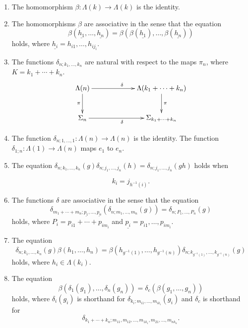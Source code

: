 \begin{thm}
\begin{enumerate}
\item\label{eq2} The homomorphism $\beta \colon \Lambda(k) \rightarrow \Lambda(k)$ is the identity.
\item\label{eq3} The homomorphisms $\beta$ are associative in the sense that the equation
\[
  \beta(\underline{h_1},\ldots,\underline{h_n}) = \beta(\beta(\underline{h_1}),\ldots,\beta(\underline{h_n}))
\]
holds, where $\underline{h_i} = h_{i1},\ldots,h_{ij_i}$.
\item\label{eq4} The functions $\delta_{n; k_{1}, \ldots, k_{n}}$ are natural with respect to the maps $\pi_{n}$, where $K = k_1 + \cdots + k_n$.
  \[
    \xy
      (0,0)*+{\Lambda(n)} ="00";
      (40,0)*+{\Lambda(k_{1} + \cdots + k_{n}) } ="20";
      (0,-15)*+{\Sigma_{n}  } ="01";
      (40,-15)*+{\Sigma_{k_{1} + \cdots + k_{n}} } ="21";
      {\ar^{\delta} "00" ; "20"};
      {\ar^{\pi} "20" ; "21"};
      {\ar_{\pi} "00" ; "01"};
      {\ar_{\delta} "01" ; "21"};
    \endxy
  \]


\item\label{eq5} The function $\delta_{n; 1, \ldots, 1} \colon \Lambda(n) \rightarrow \Lambda(n)$ is the identity. The function $\delta_{1;n} \colon \Lambda(1) \to \Lambda(n)$ maps $e_1$ to $e_n$.

\item\label{eq6} The equation $\delta_{n; k_1, \ldots, k_n}(g) \delta_{n; j_1, \ldots, j_n}(h) = \delta_{n; j_1,\ldots,j_n}(gh)$ holds when

  \[
    k_{i} = j_{h^{-1}(i)}.
  \]
\item\label{eq7} The functions $\delta$ are associative in the sense that the equation
  \[
    \delta_{m_1 + \cdots + m_n; \underline{p_1},\ldots,\underline{p_n}}\left( \delta_{n; m_{1}, \ldots, m_{n}}(g) \right) = \delta_{n; P_{1}, \ldots, P_{n}}(g)
  \]
holds, where $P_{i} = p_{i1} + \cdots + p_{im_{i}}$ and $\underline{p_i} = p_{i1}, \ldots, p_{im_i}$.
\item\label{eq8} The equation
  \[
    \delta_{n;k_1,\ldots,k_n}(g) \beta(h_{1}, \ldots, h_{n}) = \beta(h_{g^{-1}(1)}, \ldots,  h_{g^{-1}(n)}) \delta_{n;k_{g^{-1}(1)},\ldots,k_{g^{-1}(n)}}(g)
  \]
holds, where $h_{i} \in \Lambda(k_{i})$.
\item\label{eq9} The equation
  \[
    \beta(\delta_{1}(g_{1}), \ldots, \delta_{n}(g_{n})) = \delta_{c}(\beta(g_{1}, \ldots, g_{n}))
  \]
holds, where $\delta_{i}(g_{i})$ is shorthand for $\delta_{k_{i}; m_{i1}, \ldots, m_{ik_{i}}}(g_{i})$ and $\delta_{c}$ is shorthand for
  \[
    \delta_{k_{1}+\cdots + k_{n}; m_{11}, m_{12}, \ldots, m_{1k_{1}}, m_{21}, \ldots, m_{nk_{n}}}.
  \]
\end{enumerate}
\end{thm}

